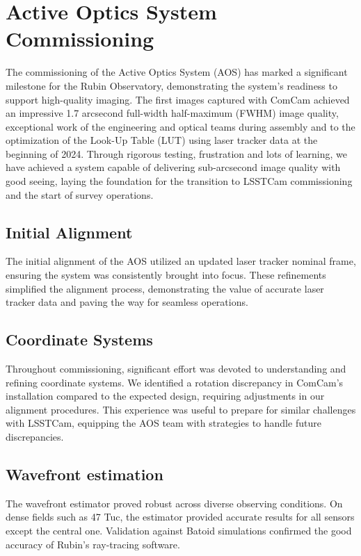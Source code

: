 \section{Active Optics System Commissioning}
\label{sec:aos_commissioning}

The commissioning of the Active Optics System (AOS) has marked a significant milestone for the Rubin Observatory, 
demonstrating the system's readiness to support high-quality imaging. The first images captured with ComCam 
achieved an impressive 1.7 arcsecond full-width half-maximum (FWHM) image quality, exceptional work of the engineering 
and optical teams during assembly and to the optimization of the Look-Up Table (LUT) using laser tracker data at
the beginning of 2024. Through rigorous testing, frustration and lots of learning, 
we have achieved a system capable of delivering sub-arcsecond image quality with good seeing, 
laying the foundation for the transition to LSSTCam commissioning and the start of survey operations.

\subsection{Initial Alignment}
The initial alignment of the AOS utilized an updated laser tracker nominal frame, ensuring the system was 
consistently brought into focus. These refinements simplified the alignment process, demonstrating the 
value of accurate laser tracker data and paving the way for seamless operations.

\subsection{Coordinate Systems}
Throughout commissioning, significant effort was devoted to understanding and refining coordinate systems. 
We identified a rotation discrepancy in ComCam's installation compared to the expected design, requiring 
adjustments in our alignment procedures. This experience was useful to prepare for similar challenges 
with LSSTCam, equipping the AOS team with strategies to handle future discrepancies.

\subsection{Wavefront estimation}
The wavefront estimator proved robust across diverse observing conditions. 
On dense fields such as 47 Tuc, the estimator provided accurate results for 
all sensors except the central one. Validation against Batoid simulations confirmed 
the good accuracy of Rubin's ray-tracing software.


